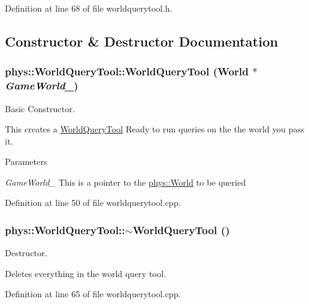 Definition at line 68 of file worldquerytool.h.



\subsection{Constructor \& Destructor Documentation}
\hypertarget{classphys_1_1WorldQueryTool_a6b156ab7ea6236402c40467da7f11c0d}{
\subsubsection[{WorldQueryTool}]{\setlength{\rightskip}{0pt plus 5cm}phys::WorldQueryTool::WorldQueryTool ({\bf World} $\ast$ {\em GameWorld\_\-})}}
\label{d8/d69/classphys_1_1WorldQueryTool_a6b156ab7ea6236402c40467da7f11c0d}


Basic Constructor. 

This creates a \hyperlink{classphys_1_1WorldQueryTool}{WorldQueryTool} Ready to run queries on the the world you pass it. 
\begin{DoxyParams}{Parameters}
\item[{\em GameWorld\_\-}]This is a pointer to the \hyperlink{classphys_1_1World}{phys::World} to be queried \end{DoxyParams}


Definition at line 50 of file worldquerytool.cpp.

\hypertarget{classphys_1_1WorldQueryTool_ace36ffebcabbbf0553c517820bc636c9}{
\subsubsection[{$\sim$WorldQueryTool}]{\setlength{\rightskip}{0pt plus 5cm}phys::WorldQueryTool::$\sim$WorldQueryTool ()}}
\label{d8/d69/classphys_1_1WorldQueryTool_ace36ffebcabbbf0553c517820bc636c9}


Destructor. 

Deletes everything in the world query tool. 

Definition at line 65 of file worldquerytool.cpp.



